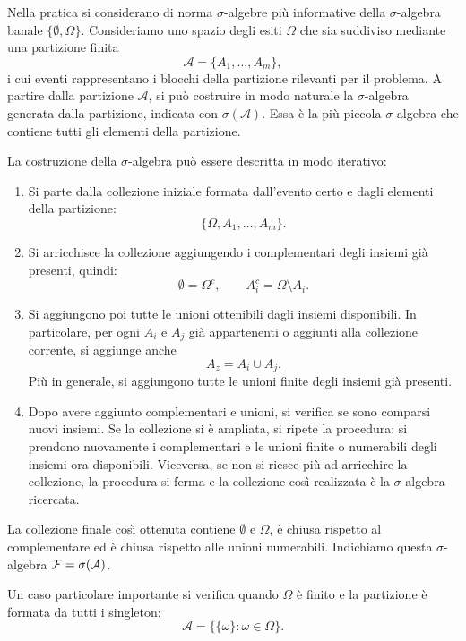 Nella pratica si considerano di norma $\sigma$-algebre pi\`{u} informative
della $\sigma$-algebra banale $\{\emptyset,\Omega\}$. 
Consideriamo uno spazio degli
esiti $\Omega$ che sia suddiviso mediante una partizione finita
\[
\mathcal{A}=\{A_1,\ldots,A_m\},
\]
i cui eventi rappresentano i blocchi della partizione rilevanti per il
problema. A partire dalla partizione $\mathcal{A}$, si pu\`{o} costruire in modo naturale
la $\sigma$-algebra generata dalla partizione, indicata con
$\sigma(\mathcal{A})$. Essa \`{e} la pi\`{u} piccola $\sigma$-algebra che
contiene tutti gli elementi della partizione.

La costruzione della $\sigma$-algebra pu\`{o} essere descritta in modo iterativo:

\begin{enumerate}
\item Si parte dalla collezione iniziale formata dall'evento certo e dagli elementi  della partizione:
\[
\{\Omega,A_1,\ldots,A_m\}.
\]

\item Si arricchisce la collezione aggiungendo i
complementari degli insiemi gi\`{a} presenti, quindi:
\[
\emptyset =\Omega^c, \qquad
A_i^c=\Omega\setminus A_i.
\]

\item Si aggiungono poi tutte le unioni ottenibili dagli insiemi disponibili.
In particolare, per ogni $A_i$ e $A_j$ gi\`{a} appartenenti o aggiunti alla collezione corrente, si aggiunge anche
\[
A_z=A_i\cup A_j.
\]
Pi\`{u} in generale, si aggiungono tutte le unioni finite degli insiemi gi\`{a}
presenti.

\item Dopo avere aggiunto complementari e unioni, si verifica se sono comparsi
nuovi insiemi. Se la collezione si \`{e} ampliata, si ripete la procedura:
si prendono nuovamente i complementari e le unioni finite o numerabili degli insiemi ora disponibili. Viceversa, se non si riesce pi\`{u} ad arricchire la collezione, la procedura si ferma e la collezione cos\`{i} realizzata \`{e} la $\sigma$-algebra ricercata.
\end{enumerate}

La collezione finale cos\`{\i} ottenuta contiene $\emptyset$ e $\Omega$, \`{e}
chiusa rispetto al complementare ed \`{e} chiusa rispetto alle unioni
numerabili. Indichiamo questa $\sigma$-algebra $\mathcal{F}=\sigma(\mathcal{A})$.

Un caso particolare importante si verifica quando $\Omega$ \`{e} finito e la
partizione \`{e} formata da tutti i singleton:
\[
\mathcal{A}
=
\big\{
\{\omega\}:\omega\in\Omega
\big\}.
\]

